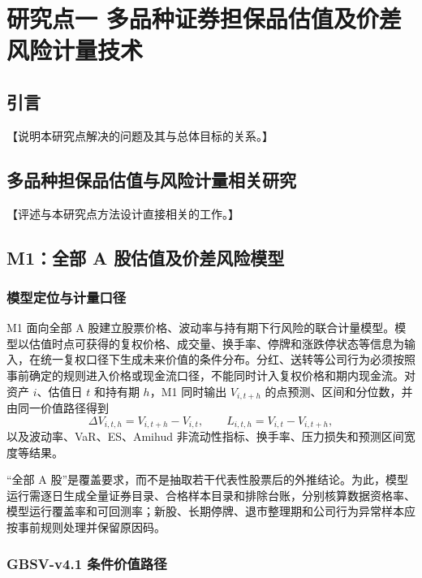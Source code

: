 \chapter{研究点一 多品种证券担保品估值及价差风险计量技术}

\section{引言}

【说明本研究点解决的问题及其与总体目标的关系。】

\section{多品种担保品估值与风险计量相关研究}

【评述与本研究点方法设计直接相关的工作。】

\section{M1：全部 A 股估值及价差风险模型}
\label{sec:m1-equity}

\subsection{模型定位与计量口径}

M1 面向全部 A 股建立股票价格、波动率与持有期下行风险的联合计量模型。模型以估值时点可获得的复权价格、成交量、换手率、停牌和涨跌停状态等信息为输入，在统一复权口径下生成未来价值的条件分布。分红、送转等公司行为必须按照事前确定的规则进入价格或现金流口径，不能同时计入复权价格和期内现金流。对资产 \(i\)、估值日 \(t\) 和持有期 \(h\)，M1 同时输出 \(V_{i,t+h}\) 的点预测、区间和分位数，并由同一价值路径得到
\begin{equation}
  \Delta V_{i,t,h}=V_{i,t+h}-V_{i,t},\qquad
  L_{i,t,h}=V_{i,t}-V_{i,t+h},
\end{equation}
以及波动率、VaR、ES、Amihud 非流动性指标、换手率、压力损失和预测区间宽度等结果\cite{amihud_2002,artzner_1999}。

“全部 A 股”是覆盖要求，而不是抽取若干代表性股票后的外推结论。为此，模型运行需逐日生成全量证券目录、合格样本目录和排除台账，分别核算数据资格率、模型运行覆盖率和可回测率；新股、长期停牌、退市整理期和公司行为异常样本应按事前规则处理并保留原因码。

\subsection{GBSV-v4.1 条件价值路径}

